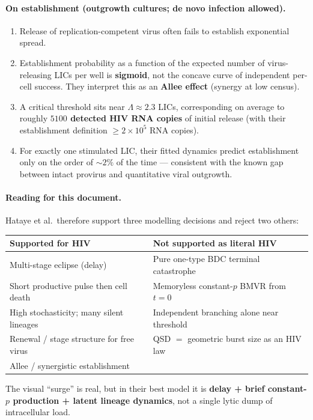 \documentclass[11pt,a4paper]{article}
\theoremstyle{plain}
\theoremstyle{definition}
\theoremstyle{remark}
\begin{document}
\paragraph{On establishment (outgrowth cultures; de novo infection allowed).}
\begin{enumerate}
\item Release of replication-competent virus often fails to establish exponential
spread.
\item Establishment probability as a function of the expected number of
virus-releasing LICs per well is \textbf{sigmoid}, not the concave curve of
independent per-cell success. They interpret this as an \textbf{Allee effect}
(synergy at low census).
\item A critical threshold sits near $\Lambda\approx 2.3$ LICs, corresponding on
average to roughly \textbf{$5100$ detected HIV RNA copies} of initial release
(with their establishment definition $\ge 2\times 10^5$ RNA copies).
\item For exactly one stimulated LIC, their fitted dynamics predict establishment
only on the order of \textbf{$\sim 2\%$} of the time --- consistent with the known
gap between intact provirus and quantitative viral outgrowth.
\end{enumerate}

\paragraph{Reading for this document.}
Hataye et al.\ therefore support three modelling decisions and reject two others:
\begin{center}
\renewcommand{\arraystretch}{1.3}
\begin{tabular}{@{}p{}p{}@{}}
\toprule
Supported for HIV & Not supported as literal HIV \\
\midrule
Multi-stage eclipse (delay) & Pure one-type BDC terminal catastrophe \\
Short productive pulse then cell death & Memoryless constant-$p$ BMVR from $t=0$ \\
High stochasticity; many silent lineages & Independent branching alone near threshold \\
Renewal / stage structure for free virus & QSD $=$ geometric burst size as an HIV law \\
Allee / synergistic establishment & \\
\bottomrule
\end{tabular}
\end{center}
The visual ``surge'' is real, but in their best model it is
\textbf{delay + brief constant-$p$ production + latent lineage dynamics}, not a
single lytic dump of intracellular load.
\end{document}
